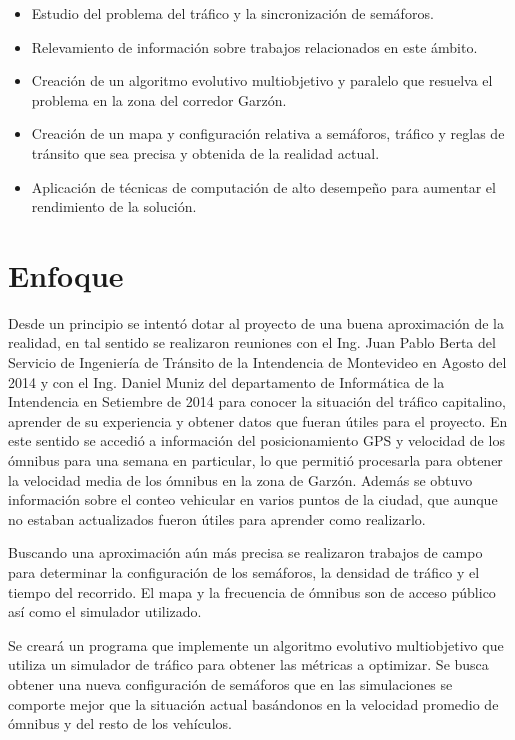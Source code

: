 \begin{itemize}
	\item Estudio del problema del tráfico y la sincronización de semáforos.
	\item Relevamiento de información sobre trabajos relacionados en este ámbito.
	\item Creación de un algoritmo evolutivo multiobjetivo y paralelo que resuelva el problema en la zona del corredor Garzón.
	\item Creación de un mapa y configuración relativa a semáforos, tráfico y reglas de tránsito que sea precisa y obtenida de la realidad actual.	
	\item Aplicación de técnicas de computación de alto desempeño para aumentar el rendimiento de la solución.

\end{itemize}

 
\section{Enfoque}

Desde un principio se intentó dotar al proyecto de una buena aproximación de la realidad, en tal sentido se realizaron reuniones con el Ing. Juan Pablo Berta del Servicio de Ingeniería de Tránsito de la Intendencia de Montevideo en Agosto del  2014 y con el Ing. Daniel Muniz del departamento de Informática de la Intendencia en Setiembre de 2014 para conocer la situación del tráfico capitalino, aprender de su experiencia y obtener datos que fueran útiles para el proyecto. En este sentido se accedió a información del posicionamiento GPS y velocidad de los ómnibus para una semana en particular, lo que permitió procesarla para obtener la velocidad media de los ómnibus en la zona de Garzón. Además se obtuvo información sobre el conteo vehicular en varios puntos de la ciudad, que aunque no estaban actualizados fueron útiles para aprender como realizarlo.

Buscando una aproximación aún más precisa se realizaron trabajos de campo para determinar la configuración de los semáforos, la densidad de tráfico y el tiempo del recorrido. El mapa y la frecuencia de ómnibus son de acceso público así como el simulador utilizado.

Se creará un programa que implemente un algoritmo evolutivo multiobjetivo que utiliza un simulador de tráfico para obtener las métricas a optimizar. Se busca obtener una nueva configuración de semáforos que en las simulaciones se comporte mejor que la situación actual basándonos en la velocidad promedio de ómnibus y del resto de los vehículos.

